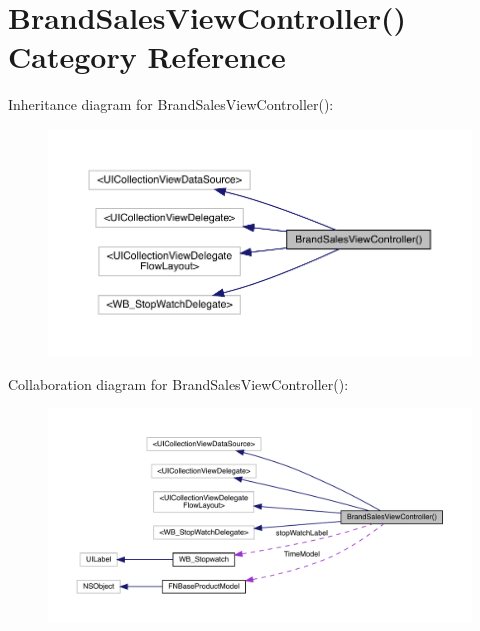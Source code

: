 \hypertarget{category_brand_sales_view_controller_07_08}{}\section{Brand\+Sales\+View\+Controller() Category Reference}
\label{category_brand_sales_view_controller_07_08}


Inheritance diagram for Brand\+Sales\+View\+Controller()\+:\nopagebreak
\begin{figure}[H]
\begin{center}
\leavevmode
\includegraphics[width=350pt]{category_brand_sales_view_controller_07_08__inherit__graph}
\end{center}
\end{figure}


Collaboration diagram for Brand\+Sales\+View\+Controller()\+:\nopagebreak
\begin{figure}[H]
\begin{center}
\leavevmode
\includegraphics[width=350pt]{category_brand_sales_view_controller_07_08__coll__graph}
\end{center}
\end{figure}
